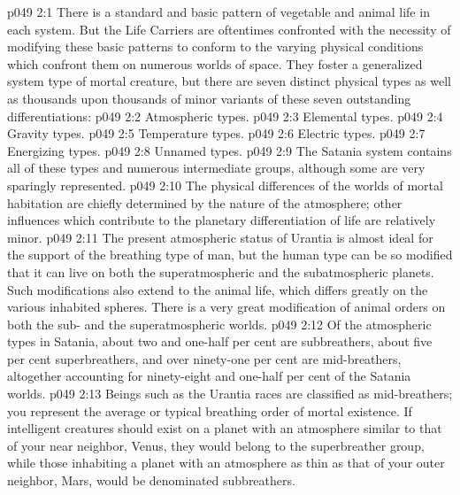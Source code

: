 \vs p049 2:1 There is a standard and basic pattern of vegetable and animal life in each system. But the Life Carriers are oftentimes confronted with the necessity of modifying these basic patterns to conform to the varying physical conditions which confront them on numerous worlds of space. They foster a generalized system type of mortal creature, but there are seven distinct physical types as well as thousands upon thousands of minor variants of these seven outstanding differentiations:
\pc \vs p049 2:2 \bibnobreakspace Atmospheric types.
\vs p049 2:3 \bibnobreakspace Elemental types.
\vs p049 2:4 \bibnobreakspace Gravity types.
\vs p049 2:5 \bibnobreakspace Temperature types.
\vs p049 2:6 \bibnobreakspace Electric types.
\vs p049 2:7 \bibnobreakspace Energizing types.
\vs p049 2:8 \bibnobreakspace Unnamed types.
\pc \vs p049 2:9 The Satania system contains all of these types and numerous intermediate groups, although some are very sparingly represented.
\pc \vs p049 2:10 \bibnobreakspace {} The physical differences of the worlds of mortal habitation are chiefly determined by the nature of the atmosphere; other influences which contribute to the planetary differentiation of life are relatively minor.
\vs p049 2:11 The present atmospheric status of Urantia is almost ideal for the support of the breathing type of man, but the human type can be so modified that it can live on both the superatmospheric and the subatmospheric planets. Such modifications also extend to the animal life, which differs greatly on the various inhabited spheres. There is a very great modification of animal orders on both the sub\hyp{} and the superatmospheric worlds.
\vs p049 2:12 Of the atmospheric types in Satania, about two and one\hyp{}half per cent are subbreathers, about five per cent superbreathers, and over ninety\hyp{}one per cent are mid\hyp{}breathers, altogether accounting for ninety\hyp{}eight and one\hyp{}half per cent of the Satania worlds.
\vs p049 2:13 Beings such as the Urantia races are classified as mid\hyp{}breathers; you represent the average or typical breathing order of mortal existence. If intelligent creatures should exist on a planet with an atmosphere similar to that of your near neighbor, Venus, they would belong to the superbreather group, while those inhabiting a planet with an atmosphere as thin as that of your outer neighbor, Mars, would be denominated subbreathers.
